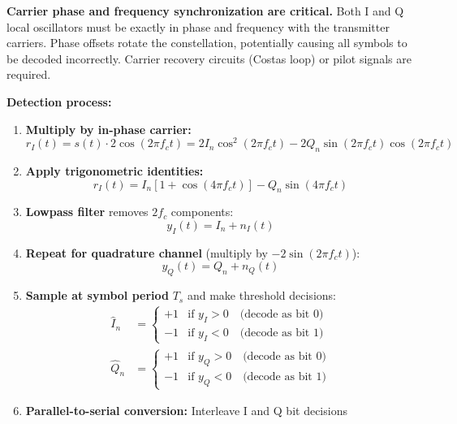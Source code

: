\begin{warningbox}
\textbf{Carrier phase and frequency synchronization are critical.} Both I and Q local oscillators must be exactly in phase and frequency with the transmitter carriers. Phase offsets rotate the constellation, potentially causing all symbols to be decoded incorrectly. Carrier recovery circuits (Costas loop) or pilot signals are required.
\end{warningbox}

\textbf{Detection process:}

\begin{enumerate}
\item \textbf{Multiply by in-phase carrier:}
\begin{equation}
r_I(t) = s(t) \cdot 2\cos(2\pi f_c t) = 2I_n \cos^2(2\pi f_c t) - 2Q_n \sin(2\pi f_c t)\cos(2\pi f_c t)
\end{equation}

\item \textbf{Apply trigonometric identities:}
\begin{equation}
r_I(t) = I_n [1 + \cos(4\pi f_c t)] - Q_n \sin(4\pi f_c t)
\end{equation}

\item \textbf{Lowpass filter} removes $2f_c$ components:
\begin{equation}
y_I(t) = I_n + n_I(t)
\end{equation}

\item \textbf{Repeat for quadrature channel} (multiply by $-2\sin(2\pi f_c t)$):
\begin{equation}
y_Q(t) = Q_n + n_Q(t)
\end{equation}

\item \textbf{Sample at symbol period} $T_s$ and make threshold decisions:
\begin{align}
\hat{I}_n &= \begin{cases}
+1 & \text{if } y_I > 0 \quad \text{(decode as bit 0)} \\
-1 & \text{if } y_I < 0 \quad \text{(decode as bit 1)}
\end{cases} \\
\hat{Q}_n &= \begin{cases}
+1 & \text{if } y_Q > 0 \quad \text{(decode as bit 0)} \\
-1 & \text{if } y_Q < 0 \quad \text{(decode as bit 1)}
\end{cases}
\end{align}

\item \textbf{Parallel-to-serial conversion:} Interleave I and Q bit decisions
\end{enumerate}


